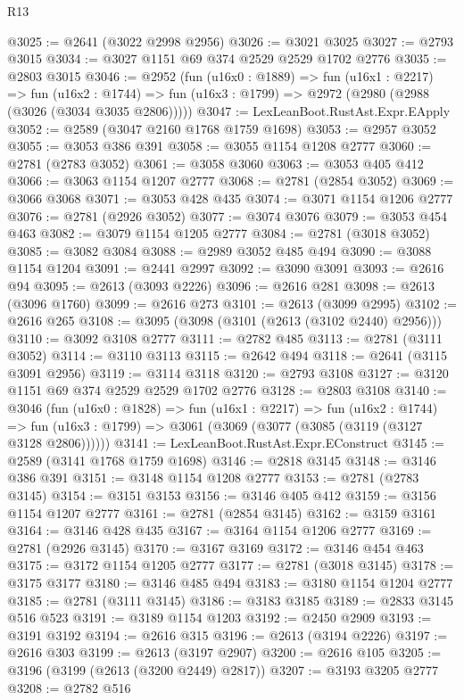 \begin{lexlean}{R13}
\begin{coremodule}
@3025 := @2641 (@3022 @2998 @2956)
@3026 := @3021 @3025
@3027 := @2793 @3015
@3034 := @3027 @1151 @69 @374 @2529 @2529 @1702 @2776
@3035 := @2803 @3015
@3046 := @2952
    (fun (u16x0 : @1889) =>
    fun (u16x1 : @2217) =>
    fun (u16x2 : @1744) => fun (u16x3 : @1799) => @2972 (@2980 (@2988 (@3026 (@3034 @3035 @2806)))))
@3047 := LexLeanBoot.RustAst.Expr.EApply
@3052 := @2589 (@3047 @2160 @1768 @1759 @1698)
@3053 := @2957 @3052
@3055 := @3053 @386 @391
@3058 := @3055 @1154 @1208 @2777
@3060 := @2781 (@2783 @3052)
@3061 := @3058 @3060
@3063 := @3053 @405 @412
@3066 := @3063 @1154 @1207 @2777
@3068 := @2781 (@2854 @3052)
@3069 := @3066 @3068
@3071 := @3053 @428 @435
@3074 := @3071 @1154 @1206 @2777
@3076 := @2781 (@2926 @3052)
@3077 := @3074 @3076
@3079 := @3053 @454 @463
@3082 := @3079 @1154 @1205 @2777
@3084 := @2781 (@3018 @3052)
@3085 := @3082 @3084
@3088 := @2989 @3052 @485 @494
@3090 := @3088 @1154 @1204
@3091 := @2441 @2997
@3092 := @3090 @3091
@3093 := @2616 @94
@3095 := @2613 (@3093 @2226)
@3096 := @2616 @281
@3098 := @2613 (@3096 @1760)
@3099 := @2616 @273
@3101 := @2613 (@3099 @2995)
@3102 := @2616 @265
@3108 := @3095 (@3098 (@3101 (@2613 (@3102 @2440) @2956)))
@3110 := @3092 @3108 @2777
@3111 := @2782 @485
@3113 := @2781 (@3111 @3052)
@3114 := @3110 @3113
@3115 := @2642 @494
@3118 := @2641 (@3115 @3091 @2956)
@3119 := @3114 @3118
@3120 := @2793 @3108
@3127 := @3120 @1151 @69 @374 @2529 @2529 @1702 @2776
@3128 := @2803 @3108
@3140 := @3046
    (fun (u16x0 : @1828) =>
    fun (u16x1 : @2217) =>
    fun (u16x2 : @1744) =>
    fun (u16x3 : @1799) => @3061 (@3069 (@3077 (@3085 (@3119 (@3127 @3128 @2806))))))
@3141 := LexLeanBoot.RustAst.Expr.EConstruct
@3145 := @2589 (@3141 @1768 @1759 @1698)
@3146 := @2818 @3145
@3148 := @3146 @386 @391
@3151 := @3148 @1154 @1208 @2777
@3153 := @2781 (@2783 @3145)
@3154 := @3151 @3153
@3156 := @3146 @405 @412
@3159 := @3156 @1154 @1207 @2777
@3161 := @2781 (@2854 @3145)
@3162 := @3159 @3161
@3164 := @3146 @428 @435
@3167 := @3164 @1154 @1206 @2777
@3169 := @2781 (@2926 @3145)
@3170 := @3167 @3169
@3172 := @3146 @454 @463
@3175 := @3172 @1154 @1205 @2777
@3177 := @2781 (@3018 @3145)
@3178 := @3175 @3177
@3180 := @3146 @485 @494
@3183 := @3180 @1154 @1204 @2777
@3185 := @2781 (@3111 @3145)
@3186 := @3183 @3185
@3189 := @2833 @3145 @516 @523
@3191 := @3189 @1154 @1203
@3192 := @2450 @2909
@3193 := @3191 @3192
@3194 := @2616 @315
@3196 := @2613 (@3194 @2226)
@3197 := @2616 @303
@3199 := @2613 (@3197 @2907)
@3200 := @2616 @105
@3205 := @3196 (@3199 (@2613 (@3200 @2449) @2817))
@3207 := @3193 @3205 @2777
@3208 := @2782 @516

\end{coremodule}
\end{lexlean}

